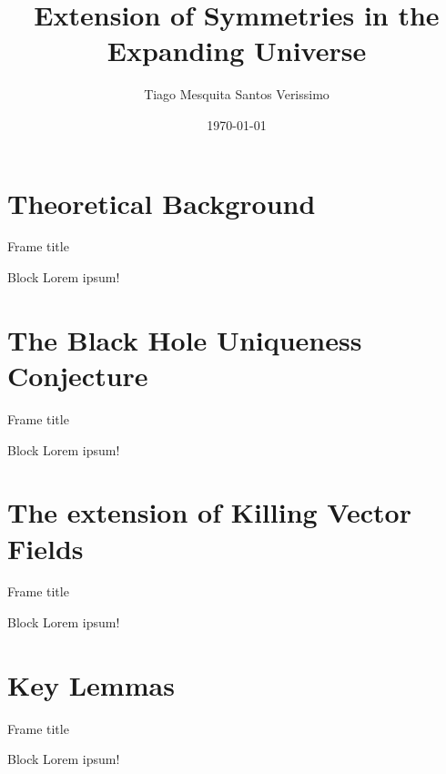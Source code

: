 \documentclass[17pt, t, lualatex]{beamer}
\title{Extension of Symmetries in the Expanding Universe}
\date{\today}
\institute[KTH]{KTH Royal Institute of Technology}
\author{Tiago Mesquita Santos Verissimo}
\begin{document}
\inserttitlepage

\section{Theoretical Background}
\insertsectionpage

\begin{frame}{Frame title}
\begin{block}{Block}
Lorem ipsum!
\end{block}
\end{frame}

\section{The Black Hole Uniqueness Conjecture}
\insertsectionpage

\begin{frame}{Frame title}
\begin{block}{Block}
Lorem ipsum!
\end{block}
\end{frame}


\section{The extension of Killing Vector Fields}

\insertsectionpage

\begin{frame}{Frame title}
\begin{block}{Block}
Lorem ipsum!
\end{block}
\end{frame}


\section{Key Lemmas}

\insertsectionpage

\begin{frame}{Frame title}
\begin{block}{Block}
Lorem ipsum!
\end{block}
\end{frame}
\end{document}
